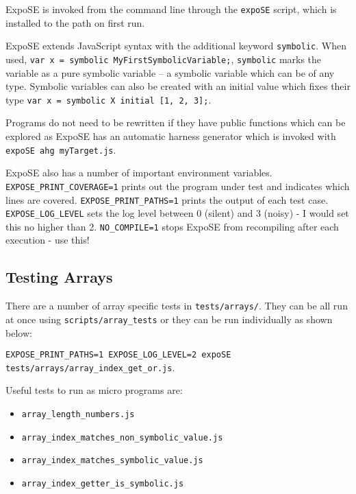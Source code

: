 \documentclass[]{final_report}
\begin{document}
ExpoSE is invoked from the command line through the \lstinline|expoSE| script, which is installed to the path on first run.

ExpoSE extends JavaScript syntax with the additional keyword \lstinline|symbolic|. When used, \lstinline|var x = symbolic MyFirstSymbolicVariable;|, \lstinline|symbolic| marks the variable as a pure symbolic variable -- a symbolic variable which can be of any type. Symbolic variables can also be created with an initial value which fixes their type \lstinline|var x = symbolic X initial [1, 2, 3];|.

Programs do not need to be rewritten if they have public functions which can be explored as ExpoSE has an automatic harness generator which is invoked with \lstinline|expoSE ahg myTarget.js|.

ExpoSE also has a number of important environment variables. \lstinline|EXPOSE_PRINT_COVERAGE=1| prints out the program under test and indicates which lines are covered. \lstinline|EXPOSE_PRINT_PATHS=1| prints the output of each test case. \lstinline|EXPOSE_LOG_LEVEL| sets the log level between 0 (silent) and 3 (noisy) - I would set this no higher than 2. \lstinline|NO_COMPILE=1| stops ExpoSE from recompiling after each execution - use this!

\subsection{Testing Arrays}
There are a number of array specific tests in \lstinline|tests/arrays/|. They can be all run at once using \lstinline|scripts/array_tests| or they can be run individually as shown below:

\lstinline|EXPOSE_PRINT_PATHS=1 EXPOSE_LOG_LEVEL=2 expoSE tests/arrays/array_index_get_or.js|.

Useful tests to run as micro programs are:
\begin{itemize}
  \item \lstinline|array_length_numbers.js|
  \item \lstinline|array_index_matches_non_symbolic_value.js|
  \item \lstinline|array_index_matches_symbolic_value.js|
  \item \lstinline|array_index_getter_is_symbolic.js|
\end{itemize}
\end{document}
